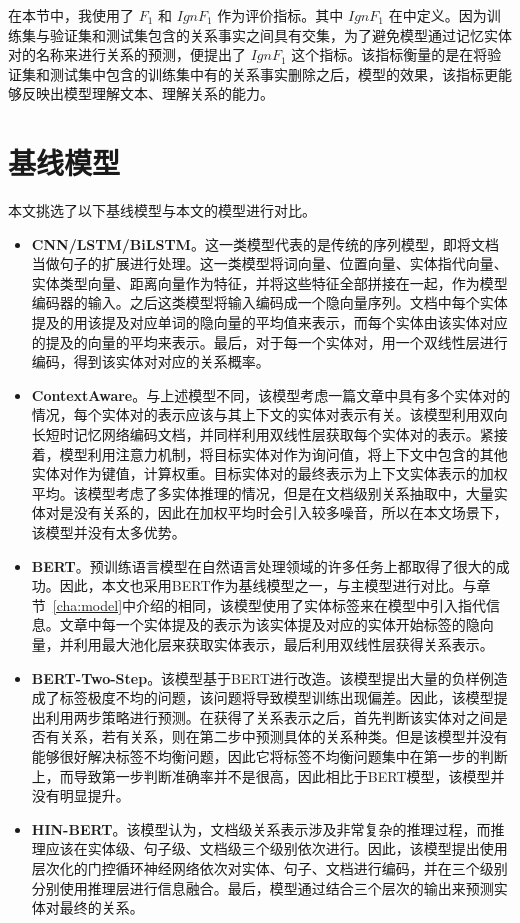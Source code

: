 在本节中，我使用了 $F_1$ 和 $IgnF_1$ 作为评价指标。其中 $IgnF_1$ 在\citet{yao2019docred}中定义。因为训练集与验证集和测试集包含的关系事实之间具有交集，为了避免模型通过记忆实体对的名称来进行关系的预测，便提出了 $IgnF_1$ 这个指标。该指标衡量的是在将验证集和测试集中包含的训练集中有的关系事实删除之后，模型的效果，该指标更能够反映出模型理解文本、理解关系的能力。


\section{基线模型}
本文挑选了以下基线模型与本文的模型进行对比。
\begin{itemize}
	\item \textbf{CNN/LSTM/BiLSTM}。这一类模型代表的是传统的序列模型，即将文档当做句子的扩展进行处理。这一类模型将词向量、位置向量、实体指代向量、实体类型向量、距离向量作为特征，并将这些特征全部拼接在一起，作为模型编码器的输入。之后这类模型将输入编码成一个隐向量序列。文档中每个实体提及的用该提及对应单词的隐向量的平均值来表示，而每个实体由该实体对应的提及的向量的平均来表示。最后，对于每一个实体对，用一个双线性层进行编码，得到该实体对对应的关系概率。
	\item \textbf{ContextAware}。与上述模型不同，该模型考虑一篇文章中具有多个实体对的情况，每个实体对的表示应该与其上下文的实体对表示有关。该模型利用双向长短时记忆网络编码文档，并同样利用双线性层获取每个实体对的表示。紧接着，模型利用注意力机制，将目标实体对作为询问值，将上下文中包含的其他实体对作为键值，计算权重。目标实体对的最终表示为上下文实体表示的加权平均。该模型考虑了多实体推理的情况，但是在文档级别关系抽取中，大量实体对是没有关系的，因此在加权平均时会引入较多噪音，所以在本文场景下，该模型并没有太多优势。
	\item \textbf{BERT}。预训练语言模型在自然语言处理领域的许多任务上都取得了很大的成功。因此，本文也采用BERT作为基线模型之一，与主模型进行对比。与章节~\ref{cha:model}中介绍的相同，该模型使用了实体标签来在模型中引入指代信息。文章中每一个实体提及的表示为该实体提及对应的实体开始标签的隐向量，并利用最大池化层来获取实体表示，最后利用双线性层获得关系表示。
	\item \textbf{BERT-Two-Step}。该模型基于BERT进行改造。该模型提出大量的负样例造成了标签极度不均的问题，该问题将导致模型训练出现偏差。因此，该模型提出利用两步策略进行预测。在获得了关系表示之后，首先判断该实体对之间是否有关系，若有关系，则在第二步中预测具体的关系种类。但是该模型并没有能够很好解决标签不均衡问题，因此它将标签不均衡问题集中在第一步的判断上，而导致第一步判断准确率并不是很高，因此相比于BERT模型，该模型并没有明显提升。
	\item \textbf{HIN-BERT}。该模型认为，文档级关系表示涉及非常复杂的推理过程，而推理应该在实体级、句子级、文档级三个级别依次进行。因此，该模型提出使用层次化的门控循环神经网络依次对实体、句子、文档进行编码，并在三个级别分别使用推理层进行信息融合。最后，模型通过结合三个层次的输出来预测实体对最终的关系。
\end{itemize}

